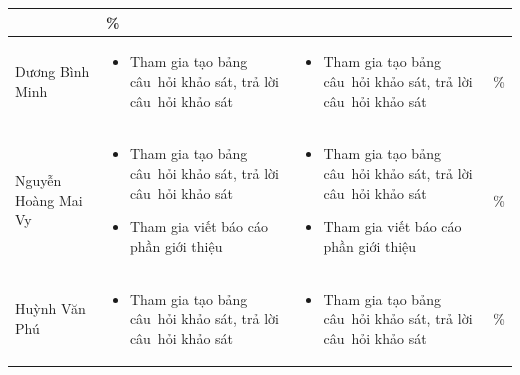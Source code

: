\documentclass[a4paper,12pt]{report}
\begin{document}
\begin{center}
\begin{longtable}{|>{\centering\arraybackslash}p{3cm}|
        >{\centering\arraybackslash}p{5.5cm}|
        >{\centering\arraybackslash}p{5.5cm}|
        >{\centering\arraybackslash}p{1.5cm}|}
                                                                           & 100\% \\
        \hline
        Dương Bình Minh                                                    &
        \begin{itemize}
            \item Tham gia tạo bảng câu~hỏi khảo sát, trả lời câu~hỏi khảo sát
        \end{itemize}
                                                                           &
        \begin{itemize}
            \item Tham gia tạo bảng câu~hỏi khảo sát, trả lời câu~hỏi khảo sát
        \end{itemize}
                                                                           & 100\% \\
        \hline
        Nguyễn Hoàng Mai Vy                                                &
        \begin{itemize}
            \item Tham gia tạo bảng câu~hỏi khảo sát, trả lời câu~hỏi khảo sát
            \item Tham gia viết báo cáo phần giới thiệu
        \end{itemize}
                                                                           &
        \begin{itemize}
            \item Tham gia tạo bảng câu~hỏi khảo sát, trả lời câu~hỏi khảo sát
            \item Tham gia viết báo cáo phần giới thiệu
        \end{itemize}
                                                                           & 100\% \\
        \hline
        Huỳnh Văn Phú                                                      &
        \begin{itemize}
            \item Tham gia tạo bảng câu~hỏi khảo sát, trả lời câu~hỏi khảo sát
        \end{itemize}
                                                                           &
        \begin{itemize}
            \item Tham gia tạo bảng câu~hỏi khảo sát, trả lời câu~hỏi khảo sát
        \end{itemize} & 100\%          \\
        \hline
    \end{longtable}
\end{center}
\end{document}
